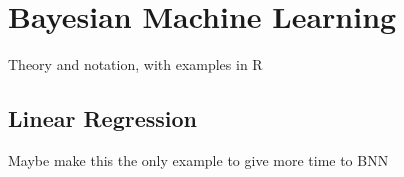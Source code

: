 \section{Bayesian Machine Learning} %

Theory and notation, with examples in R

\subsection{Linear Regression}
Maybe make this the only example to give more time to BNN










